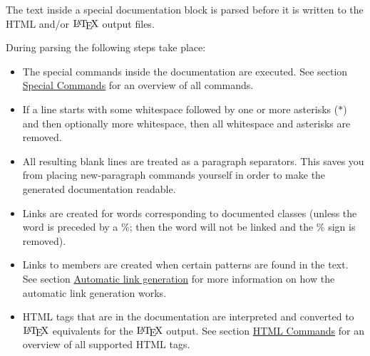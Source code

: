 The text inside a special documentation block is parsed before it is written to the HTML and/or $\mbox{\LaTeX}$ output files.

 During parsing the following steps take place: \begin{itemize}
\item The special commands inside the documentation are executed. See section \hyperlink{commands}{Special Commands} for an overview of all commands. \item If a line starts with some whitespace followed by one or more asterisks ({\tt $\ast$}) and then optionally more whitespace, then all whitespace and asterisks are removed. \item All resulting blank lines are treated as a paragraph separators. This saves you from placing new-paragraph commands yourself in order to make the generated documentation readable. \item Links are created for words corresponding to documented classes (unless the word is preceded by a \%; then the word will not be linked and the \% sign is removed). \item Links to members are created when certain patterns are found in the text. See section \hyperlink{autolink}{Automatic link generation} for more information on how the automatic link generation works. \item HTML tags that are in the documentation are interpreted and converted to $\mbox{\LaTeX}$ equivalents for the $\mbox{\LaTeX}$ output. See section \hyperlink{htmlcmds}{HTML Commands} for an overview of all supported HTML tags. \end{itemize}


 